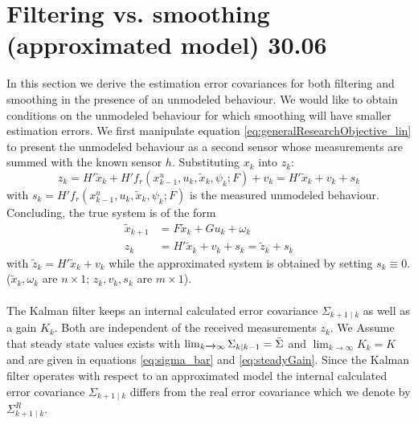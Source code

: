 \documentclass[oneside,12pt]{article}
\begin{document}
\section{Filtering vs. smoothing (approximated model) 30.06}\label{sec:F_vs_S}
%
In this section we derive the estimation error covariances for both filtering and smoothing in the presence of an unmodeled behaviour. We would like to obtain conditions on the unmodeled behaviour for which smoothing will have smaller estimation errors. We first manipulate equation \ref{eq:generalResearchObjective_lin} to present the unmodeled behaviour as a second sensor whose measurements are summed with the known sensor $h$. Substituting $x_k$ into $z_k$:
%
\begin{equation*}
    z_k = H'\tilde{x}_k + H'f_r\left( x^u_{k-1}, u_k, \tilde{x}_k, \psi_k; F\right) + v_k = H'\tilde{x}_k + v_k + s_k
\end{equation*}
%
with $s_k=H'f_r\left( x^u_{k-1}, u_k, \tilde{x}_k, \psi_k; F\right)$ is the measured unmodeled behaviour. Concluding, the true system is of the form
%
\begin{equation}\label{eq:generalResearchObjective_lin2}
    \begin{split}
        \tilde{x}_{k+1} &= F\tilde{x}_{k} + Gu_k +  \omega_k\\
        z_k &= H'\tilde{x}_k + v_k + s_k = \tilde{z}_k + s_k
    \end{split}
\end{equation}
%
with $\tilde{z}_k = H'\tilde{x}_k + v_k$ while the approximated system is obtained by setting $s_k \equiv 0$. \\($\tilde{x}_k,\omega_k$ are $n \times 1$; $z_k,v_k,s_k$ are $m \times 1$).\\\\
%
%
%
%
The Kalman filter keeps an internal calculated error covariance $\Sigma_{k+1 \mid k}$ as well as a gain $K_k$. Both are independent of the received measurements $z_k$. We Assume that steady state values exists with $\operatorname{lim}_{k \xrightarrow{} \infty} \Sigma_{k \mid k-1}= \Bar{\Sigma}$ and $\operatorname{lim}_{k \xrightarrow{} \infty} K_k = K$ and are given in equations \ref{eq:sigma_bar} and \ref{eq:steadyGain}. Since the Kalman filter operates with respect to an approximated model the internal calculated error covariance $\Sigma_{k+1 \mid k}$ differs from the real error covariance which we denote by $\Sigma^R_{k+1 \mid k}$. \\\\
\end{document}
